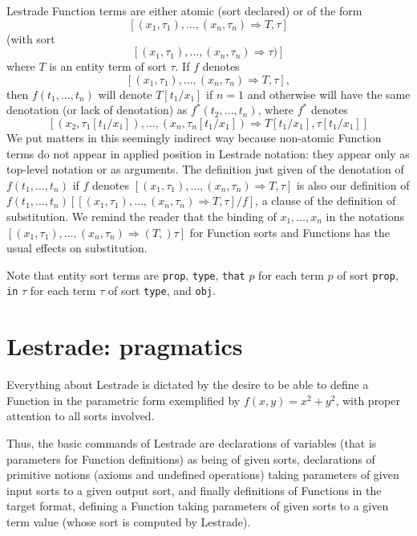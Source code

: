 \documentclass[submission,copyright,creativecommons]{eptcs}
\begin{document}
Lestrade Function terms are either atomic (sort declared) or of the form $$[(x_1,\tau_1),\ldots,(x_n,\tau_n) \Rightarrow T,\tau]$$ (with sort  $$[(x_1,\tau_1),\ldots,(x_n,\tau_n) \Rightarrow \tau)]$$ where $T$ is an entity term of sort $\tau$.  If $f$ denotes  $$[(x_1,\tau_1),\ldots,(x_n,\tau_n) \Rightarrow T,\tau],$$
then $f(t_1,\ldots,t_n)$ will denote $T[t_1/x_1]$ if $n=1$ and otherwise will have the same denotation (or lack of denotation)  as $f^*(t_2,\ldots,t_n)$, where $f^*$ denotes
$$[(x_2,\tau_1[t_1/x_1]),\ldots,(x_n,\tau_n[t_1/x_1]) \Rightarrow T[t_1/x_1],\tau[t_1/x_1]]$$  We put matters in this seemingly indirect way because non-atomic Function terms do not appear in applied position in Lestrade notation:  they appear only as top-level notation or as arguments.  The definition just
given of the denotation of  $f(t_1,\ldots,t_n)$ if $f$ denotes  $[(x_1,\tau_1),\ldots,(x_n,\tau_n) \Rightarrow T,\tau]$ is also our definition of $f(t_1,\ldots,t_n)[[(x_1,\tau_1),\ldots,(x_n,\tau_n) \Rightarrow T,\tau]/f]$, a clause of the definition of substitution.  We remind the reader that the binding of $x_1,\ldots,x_n$ in the notations $[(x_1,\tau_1),\ldots,(x_n,\tau_n) \Rightarrow (T,)\tau]$ for Function sorts and Functions has the usual effects on substitution.

Note that entity sort terms are {\tt prop}, {\tt type}, {\tt that} $p$ for each term $p$ of sort {\tt prop}, {\tt in} $\tau$ for each term $\tau$ of sort
{\tt type}, and {\tt obj}.


\section{Lestrade:  pragmatics}

Everything about Lestrade is dictated by the desire to be able to define a Function in the parametric form exemplified by $f(x,y)=x^2+y^2$, with proper attention to all sorts involved.

Thus, the basic commands of Lestrade are declarations of variables (that is parameters for Function definitions) as being of given sorts, declarations of
primitive notions (axioms and undefined operations) taking parameters of given input sorts to a given output sort, and finally definitions of Functions in the target format, defining a Function taking parameters of given sorts to a given term value (whose sort is computed by Lestrade).
\end{document}
